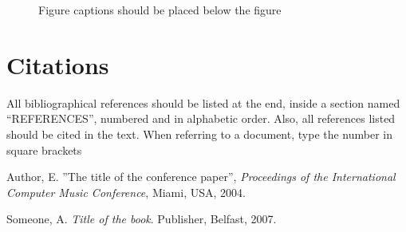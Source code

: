 \documentclass{article}
\begin{document}
\begin{figure}
\centerline{}
\caption{Figure captions should be placed below the figure}
\label{fig:example}
\end{figure}


\section{Citations}

All bibliographical references should be listed at the
end, inside a section named ``REFERENCES'', numbered
and in alphabetic order. Also, all
references listed should be cited in the text.
When referring to a document, type the number in
square brackets \cite{Author:00}

\begin{thebibliography}{citations}

 Author, E.
''The title of the conference paper'',
{\it Proceedings of the International Computer Music Conference}, Miami, USA, 2004.

 Someone, A.
{\it  Title of the book}.
Publisher, Belfast, 2007.

\end{thebibliography}
\end{document}
